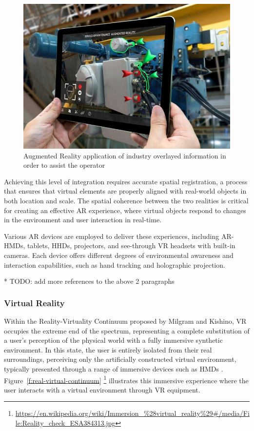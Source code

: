    \begin{figure}[!htpb]
        \centering
        \includegraphics[width=0.6\linewidth]{figs/ar-example.jpg}
        \caption{Augmented Reality application of industry overlayed information in order to assist the operator}
        \label{f:ar-example}
    \end{figure}

    Achieving this level of integration requires accurate spatial registration, a process that ensures that virtual elements are properly aligned with real-world objects in both location and scale. The spatial coherence between the two realities is critical for creating an effective \ac{AR} experience, where virtual objects respond to changes in the environment and user interaction in real-time. 

    Various \ac{AR} devices are employed to deliver these experiences, including \ac{AR}-\ac{HMDs}, tablets, \ac{HHDs}, projectors, and see-through \ac{VR} headsets with built-in cameras. Each device offers different degrees of environmental awareness and interaction capabilities, such as hand tracking and holographic projection. 

    * TODO: add more references to the above 2 paragraphs

\subsubsection{Virtual Reality}
    
    Within the Reality-Virtuality Continuum proposed by Milgram and Kishino, \ac{VR} occupies the extreme end of the spectrum, representing a complete substitution of a user’s perception of the physical world with a fully immersive synthetic environment. In this state, the user is entirely isolated from their real surroundings, perceiving only the artificially constructed virtual environment, typically presented through a range of immersive devices such as \ac{HMDs} \cite{milgram1994}. Figure~\ref{f:real-virtual-continuum} \footnote{\url{https://en.wikipedia.org/wiki/Immersion_\%28virtual_reality\%29\#/media/File:Reality_check_ESA384313.jpg}} illustrates this immersive experience where the user interacts with a virtual environment through \ac{VR} equipment.

